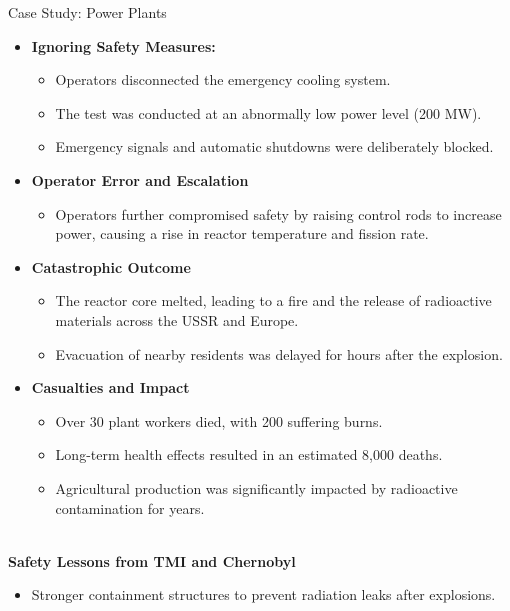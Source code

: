 \documentclass[11pt]{beamer}
\begin{document}
\begin{frame}[t,allowframebreaks]{Case Study: Power Plants}
        \begin{itemize}
            \item \textbf{Ignoring Safety Measures:}
            \begin{itemize}
                \item Operators disconnected the emergency cooling system.
                \item The test was conducted at an abnormally low power level (200 MW).
                \item Emergency signals and automatic shutdowns were deliberately blocked.
            \end{itemize}
            \item \textbf{Operator Error and Escalation}
            \begin{itemize}
                \item Operators further compromised safety by raising control rods to increase power, causing a rise
                in reactor temperature and fission rate.
            \end{itemize}
            \item \textbf{Catastrophic Outcome}
            \begin{itemize}
                \item The reactor core melted, leading to a fire and the release of radioactive materials across the
                USSR and Europe.
                \item Evacuation of nearby residents was delayed for hours after the explosion.
            \end{itemize}
            \item \textbf{Casualties and Impact}
            \begin{itemize}
                \item Over 30 plant workers died, with 200 suffering burns.
                \item Long-term health effects resulted in an estimated 8,000 deaths.
                \item Agricultural production was significantly impacted by radioactive contamination for years.
            \end{itemize}
        \end{itemize}
        \\[5pt]
        \textbf{Safety Lessons from TMI and Chernobyl}
        \begin{itemize}
            \item Stronger containment structures to prevent radiation leaks after explosions.

\end{itemize}
\end{frame}
\end{document}
